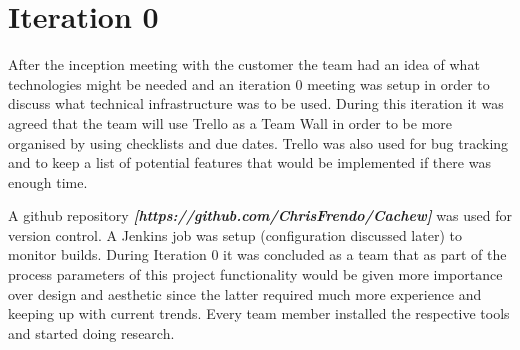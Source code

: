 \documentclass[12pt, a4paper]{report}
\begin{document}
\section{Iteration 0}
\normalsize
After the inception meeting with the customer the team had an idea of what technologies might be needed and an iteration 0 meeting was setup in order to discuss what technical infrastructure was to be used. During this iteration it was agreed that the team will use Trello as a Team Wall in order to be more organised by using checklists and due dates. Trello was also used for bug tracking and to keep a list of potential features that would be implemented if there was enough time. 
\begin{figure}[h]
\centering
\begin{center}
\end {center}
\end{figure}
\newline
\normalsize
A github repository \textbf{\textit{[https://github.com/ChrisFrendo/Cachew]}} was used for version control. A Jenkins job was setup (configuration discussed later) to monitor builds. During Iteration 0 it was concluded as a team that as part of the process parameters of this project functionality would be given more importance over design and aesthetic since the latter required much more experience and keeping up with current trends. Every team member installed the respective tools and started doing research. 
\end{document}
